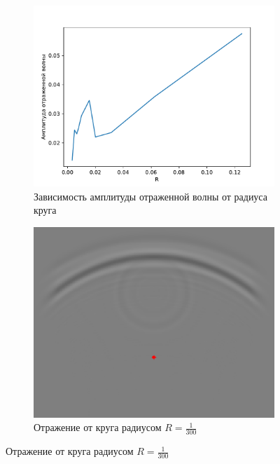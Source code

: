 \documentclass[a4paper, fontsize=14pt]{article}
\begin{document}
\begin{figure}
	\begin{subfigure}{0.6\textwidth}
	\centering
    \includegraphics[width=\textwidth]{refl_amp.pdf}
    \caption{Зависимость амплитуды отраженной волны от радиуса круга }
	\label{reflamp}
	\end{subfigure}
	\begin{subfigure}{0.35\textwidth}
	\centering
	\includegraphics[width=\textwidth]{detector.eps}
	\caption{Отражение от круга радиусом $R=\frac{1}{300}$}
	\label{detector}
	\end{subfigure}


\end{figure}
\end{document}
